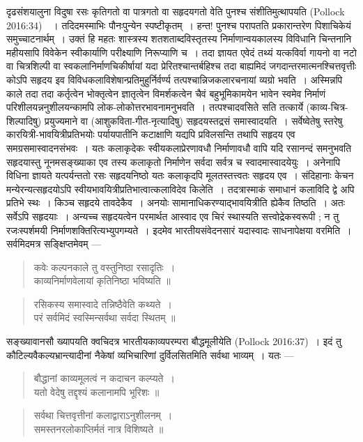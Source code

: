 {\dev दृढसंशयालुना विदुषा रसः कृतिगतो वा पात्रगतो वा सहृदयगतो वेति पुनश्च संशीतिमुत्थाप\-यति} (Pollock 2016:34)~{\dev~। तदिदमस्माभिः पौनःपुन्येन स्पष्टीकृतम्~। हन्त! पुनश्च परापतति प्रकारान्तरेण पिशाचिकेयं समुच्चाटनार्थम्~। उक्तं हि महतः शास्त्रस्य शतशताब्दविस्तृतस्य निर्माणान्वयकालस्य विविधानि चिन्तनानि महीयसापि विवेकेन स्वीकार्याणि परीक्ष्याणि निरू\-प्याणि च~। तदा ज्ञायत एवेदं तथ्यं यत्कविर्वा गायनो वा नटो वा चित्रशिल्पी वा स्वकलानिर्माण\-चिकीर्षायां यदा प्रेरितश्चान्तर्बहिश्च तदा बाह्यमिदं जगदान्तरमात्मनश्चित्तवृत्तीः कोऽपि सहृदय इव विविधकलाविशेषान्प्रतिमुहुर्निर्वर्ण्य तत्पश्चान्निजकलारचनायां व्यग्रो भवति~। अस्मिन्नपि काले तदा तदा कर्तृत्वेन भोक्तृत्वेन ज्ञातृत्वेन विमर्शकत्वेन चैवं बहुभूमिकामयेन भावेन स्वमेव निर्माणं परिशीलयन्ननुशीलयन्कामपि लोक-लोकोत्तरभावनामनुभवति~। तत्पश्चादवसिते सति तत्कार्ये (काव्य-चित्र-शिल्पादिषु) प्रयुज्यमाने वा (आशुकविता-गीत-नृत्यादिषु) सहृदयस्तद्रसं समास्वादयति~। सर्वेष्वेतेषु स्तरेषु कारयित्री-भावयित्रीप्रतिभयोः पर्यायपातीनि कटाक्षाणि यद्यपि प्रविलसन्ति तथापि सहृदय एव समग्रसमास्वादनसंभवः~। यतः कलाकृदेकः स्वीय\-कलाप्रेरणावधौ निर्माणावधौ वापि यदि रसानन्दं समनुभवति सहृदयास्तु नूनमसङ्ख्याका एव तस्य कलाकृतो निर्माणेन सर्वदा सर्वत्र च स्वादमास्वादयेयुः~। अनेनापि विधिना ज्ञायते यत्पर्यन्ततो रसः सहृदयनिष्ठो यतः कलाकृदपि मूलतस्तत्त्वतः सहृदय एव~। संदिहानाः केचन मन्येरन्यत्सहृदयोऽपि स्वीयभावयित्रीप्रतिभात्वात्कलाविदेव किलेति~। तदत्रास्माकं समाधानं कलाविदि द्वे अपि प्रतिभे स्थः~। किञ्च सहृदये तावदेकैव~। अनयोः सामानाधिकरण्याद्भावयि\-त्रीति ह्येकैव तिष्ठति~। अतः सर्वेऽपि सहृदयाः~। अन्यच्च सहृदयत्वेन परमार्थत आस्वाद एव चिरं स्थास्यति सत्त्वोद्रेकस्वरूपी ; न तु रजःस्पर्शमयी निर्माणशक्तिरित्यभ्युपगम्यते~। इदमेव भारतीयसंवेदनसारं यदास्वादः साधनापेक्षया वरमिति~। सर्वमिदमत्र सङ्क्षिप्तमेवम् --- }   
\begin{quote}
{\dev कवेः कल्पनकाले तु वस्तुनिष्ठा रसादृतिः~।}\\
{\dev काव्यनिर्माणवेलायां कृतिनिष्ठा भविष्यति ॥}
\end{quote}
\begin{quote}
{\dev रसिकस्य समास्वादे तन्निष्ठैवेति कथ्यते~।}\\
{\dev परं सर्वमिदं स्वस्मिन्सर्वथा सर्वदा स्थितम् ॥}
\end{quote}

{\dev सङ्ख्यावानसौ ख्यापयति क्वचिदत्र भारतीयकाव्यपरम्परा बौद्धमूलीयेति} (Pollock 2016:37){\dev~। इदं तु कौटिल्यवैकल्यभ्रान्त्यादीनां नैकेषां व्यभिचारिणां दुर्विलसितमिति सर्वथा भाव्यम्~। यतः ---}
\begin{quote}
{\dev बौद्धानां काव्यमूलत्वं न कदाचन कल्प्यते~।}\\
{\dev यतो वेदेषु तद्दृश्यं कलानामपि भूरिशः ॥}
\end{quote}
\begin{quote}
{\dev सर्वथा चित्तवृत्तीनां कलाद्वाराऽनुशीलनम्~।}\\
{\dev समस्तनरलोकाप्तिर्मतं नात्र विशिष्यते ॥}
\end{quote}

